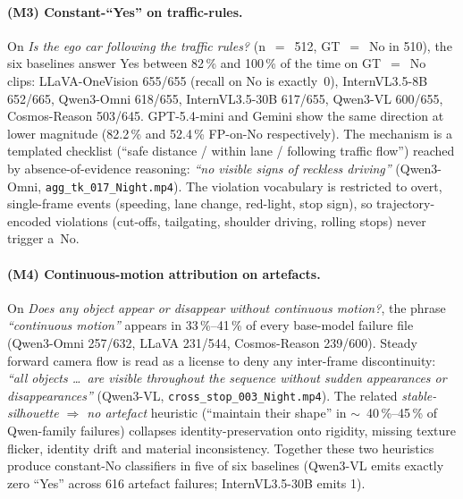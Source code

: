 \documentclass[11pt,a4paper]{article}
\newcommand{\pct}[1]{#1\,\%}
\newcommand{\code}[1]{\texttt{#1}}
\begin{document}
\paragraph{(M3) Constant-``Yes'' on traffic-rules.} On \emph{Is the ego
car following the traffic rules?} (n~$=$~512, GT~$=$~No in 510), the
six baselines answer Yes between \pct{82} and \pct{100} of the time on
GT~$=$~No clips: LLaVA-OneVision 655/655 (recall on No is exactly~0),
InternVL3.5-8B 652/665, Qwen3-Omni 618/655, InternVL3.5-30B 617/655,
Qwen3-VL 600/655, Cosmos-Reason 503/645. GPT-5.4-mini and Gemini show
the same direction at lower magnitude (\pct{82.2} and \pct{52.4}
FP-on-No respectively). The mechanism is a templated checklist
(``safe distance / within lane / following traffic flow'') reached by
absence-of-evidence reasoning: \emph{``no visible signs of
reckless driving''} (Qwen3-Omni, \code{agg\_tk\_017\_Night.mp4}). The
violation vocabulary is restricted to overt, single-frame events
(speeding, lane change, red-light, stop sign), so trajectory-encoded
violations (cut-offs, tailgating, shoulder driving, rolling stops) never
trigger a~No.

\paragraph{(M4) Continuous-motion attribution on artefacts.} On
\emph{Does any object appear or disappear without continuous motion?},
the phrase \emph{``continuous motion''} appears in \pct{33}--\pct{41} of
every base-model failure file (Qwen3-Omni 257/632, LLaVA 231/544,
Cosmos-Reason 239/600). Steady forward camera flow is read as a license
to deny any inter-frame discontinuity: \emph{``all objects \dots\ are
visible throughout the sequence without sudden appearances or
disappearances''} (Qwen3-VL, \code{cross\_stop\_003\_Night.mp4}). The
related \emph{stable-silhouette $\Rightarrow$ no artefact} heuristic
(``maintain their shape'' in $\sim$~\pct{40}--\pct{45} of Qwen-family
failures) collapses identity-preservation onto rigidity, missing
texture flicker, identity drift and material inconsistency. Together
these two heuristics produce constant-No classifiers in five of six
baselines (Qwen3-VL emits exactly zero ``Yes'' across 616 artefact
failures; InternVL3.5-30B emits 1).
\end{document}
